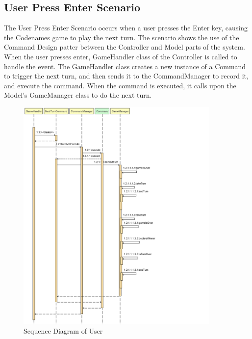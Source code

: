 \subsection{User Press Enter Scenario}
The User Press Enter Scenario occurs when a user presses the Enter key, causing the Codenames game to play the next turn. The scenario shows the use of the Command Design patter between the Controller and Model parts of the system. When the user presses enter, GameHandler class of the Controller is called to handle the event. The GameHandler class creates a new instance of a Command to trigger the next turn, and then sends it to the CommandManager to record it, and execute the command. When the command is executed, it calls upon the Model's GameManager class to do the next turn.

\begin{figure}[H]
\centering
\includegraphics[width=10cm]{Source/DynamicDesign/Scenario/User.png}
\caption{Sequence Diagram of User}
\end{figure}